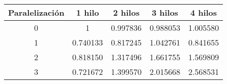 \begin{tabular}{|c|c|c|c|c|}
\hline \textbf{Paralelización} & \textbf{1 hilo} & \textbf{2 hilos} & \textbf{3 hilos} & \textbf{4 hilos
}\\ 
\hline 0 & 1 & 0.997836 & 0.988053 & 1.005580
\\ 
\hline 1 & 0.740133 & 0.817245 & 1.042761 & 0.841655
\\ 
\hline 2 & 0.818150 & 1.317496 & 1.661755 & 1.569809
\\ 
\hline 3 & 0.721672 & 1.399570 & 2.015668 & 2.568531
\\ 
\hline\end{tabular}